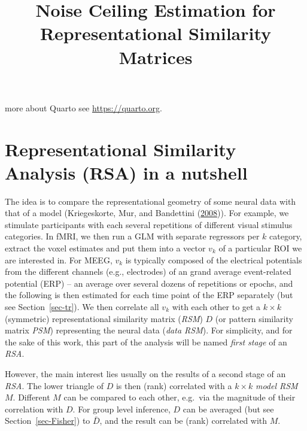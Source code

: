 \documentclass[
  letterpaper,
  DIV=11,
  numbers=noendperiod]{scrartcl}
\title{Noise Ceiling Estimation for Representational Similarity
Matrices}
\author{}
\date{}
\begin{document}
\maketitle
\ifdefined\Shaded\renewenvironment{Shaded}{\begin{tcolorbox}[boxrule=0pt, interior hidden, breakable, borderline west={3pt}{0pt}{shadecolor}, sharp corners, enhanced, frame hidden]}{\end{tcolorbox}}\fi


more about Quarto see \url{https://quarto.org}.

\hypertarget{sec-RSA}{%
\section{Representational Similarity Analysis (RSA) in a
nutshell}\label{sec-RSA}}

The idea is to compare the representational geometry of some neural data
with that of a model (Kriegeskorte, Mur, and Bandettini
(\protect\hyperlink{ref-kriegeskorte2008}{2008})). For example, we
stimulate participants with each several repetitions of different visual
stimulus categories. In fMRI, we then run a GLM with separate regressors
per \(k\) category, extract the voxel estimates and put them into a
vector \(v_k\) of a particular ROI we are interested in. For MEEG,
\(v_k\) is typically composed of the electrical potentials from the
different channels (e.g., electrodes) of an grand average event-related
potential (ERP) -- an average over several dozens of repetitions or
epochs, and the following is then estimated for each time point of the
ERP separately (but see Section~\ref{sec-tr}). We then correlate all
\(v_k\) with each other to get a \(k \times k\) (symmetric)
representational similarity matrix (\emph{RSM}) \(D\) (or pattern
similarity matrix \emph{PSM}) representing the neural data (\emph{data
RSM}). For simplicity, and for the sake of this work, this part of the
analysis will be named \emph{first stage} of an \emph{RSA}.

However, the main interest lies usually on the results of a second stage
of an \emph{RSA}. The lower triangle of \(D\) is then (rank) correlated
with a \(k \times k\) \emph{model RSM} \(M\). Different \(M\) can be
compared to each other, e.g.~via the magnitude of their correlation with
\(D\). For group level inference, \(D\) can be averaged (but see
Section~\ref{sec-Fisher}) to \(\bar{D}\), and the result can be (rank)
correlated with \(M\).
\end{document}
